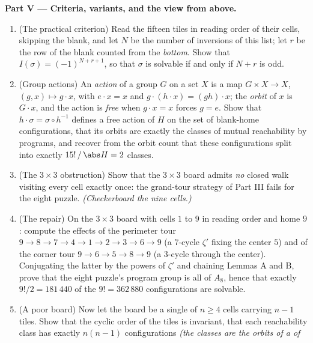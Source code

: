 \begin{problem}
\medskip
\noindent\textbf{Part V --- Criteria, variants, and the view
from above.}
\begin{enumerate}[resume]
  \item (The practical criterion) Read the fifteen tiles in
        reading order of their cells, skipping the blank, and let
        $N$ be the number of inversions of this list; let $r$ be
        the row of the blank counted from the \emph{bottom}. Show
        that $I(\sigma) = (-1)^{N + r + 1}$, so that $\sigma$ is
        solvable if and only if $N + r$ is odd.
  \item (Group actions) An \emph{action} of a group $G$ on a set
        $X$ is a map $G \times X \to X$, $(g, x) \mapsto g \cdot
        x$, with $e \cdot x = x$ and $g \cdot (h \cdot x) =
        (gh) \cdot x$; the \emph{orbit} of $x$ is $G \cdot x$, and
        the action is \emph{free} when $g \cdot x = x$ forces $g =
        e$. Show that $h \cdot \sigma = \sigma \circ h^{-1}$
        defines a free action of $H$ on the set of blank-home
        configurations, that its orbits are exactly the classes of
        mutual reachability by programs, and recover from the
        orbit count that these configurations split into exactly
        $15!\,/\,\abs H = 2$ classes.
  \item (The $3 \times 3$ obstruction) Show that the $3 \times 3$
        board admits \emph{no} closed walk visiting every cell
        exactly once: the grand-tour strategy of Part III fails
        for the eight puzzle. \emph{(Checkerboard the nine
        cells.)}
  \item (The repair) On the $3 \times 3$ board with cells $1$ to
        $9$ in reading order and home $9$: compute the effects of
        the perimeter tour $9 \to 8 \to 7 \to 4 \to 1 \to 2 \to 3
        \to 6 \to 9$ (a $7$-cycle $\zeta'$ fixing the center $5$)
        and of the corner tour $9 \to 6 \to 5 \to 8 \to 9$ (a
        $3$-cycle through the center). Conjugating the latter by
        the powers of $\zeta'$ and chaining Lemmas A and B, prove
        that the eight puzzle's program group is all of $A_8$,
        hence that exactly $9!/2 = 181\,440$ of the $9! =
        362\,880$ configurations are solvable.
  \item (A poor board) Now let the board be a single  of $n
        \geq 4$ cells carrying $n - 1$ tiles. Show that the cyclic
        order of the tiles is invariant, that each reachability
        class has exactly $n(n - 1)$ configurations \emph{(the
        classes are the orbits of a  of 
}
\end{enumerate}
\end{problem}
